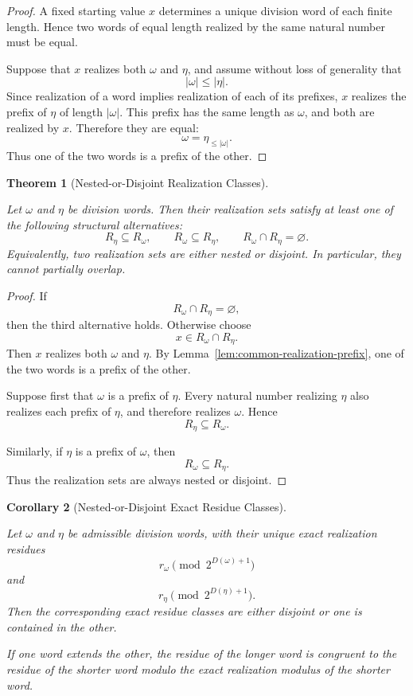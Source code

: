 \documentclass[12pt, oneside]{article}
\numberwithin{equation}{section}
\theoremstyle{definition}
\theoremstyle{plain}
\newtheorem{theorem}{Theorem}[section]
\newtheorem{corollary}[theorem]{Corollary}
\theoremstyle{remark}
\begin{document}
\begin{proof}
A fixed starting value \(x\) determines a unique division word of each
finite length. Hence two words of equal length realized by the same
natural number must be equal.

Suppose that \(x\) realizes both \(\omega\) and \(\eta\), and assume
without loss of generality that
\[
|\omega|\le|\eta|.
\]
Since realization of a word implies realization of each of its prefixes,
\(x\) realizes the prefix of \(\eta\) of length \(|\omega|\). This prefix
has the same length as \(\omega\), and both are realized by \(x\).
Therefore they are equal:
\[
\omega=\eta_{\le|\omega|}.
\]
Thus one of the two words is a prefix of the other.
\end{proof}

\begin{theorem}[Nested-or-Disjoint Realization Classes]
\label{thm:realization-classes-nested-disjoint}

Let \(\omega\) and \(\eta\) be division words. Then their realization sets
satisfy at least one of the following structural alternatives:
\[
R_\eta\subseteq R_\omega,
\qquad
R_\omega\subseteq R_\eta,
\qquad
R_\omega\cap R_\eta=\varnothing.
\]
Equivalently, two realization sets are either nested or disjoint. In
particular, they cannot partially overlap.
\end{theorem}

\begin{proof}
If
\[
R_\omega\cap R_\eta=\varnothing,
\]
then the third alternative holds.  Otherwise choose
\[
x\in R_\omega\cap R_\eta.
\]
Then \(x\) realizes both \(\omega\) and \(\eta\). By
Lemma~\ref{lem:common-realization-prefix}, one of the two words is a
prefix of the other.

Suppose first that \(\omega\) is a prefix of \(\eta\). Every natural
number realizing \(\eta\) also realizes each prefix of \(\eta\), and
therefore realizes \(\omega\). Hence
\[
R_\eta\subseteq R_\omega.
\]

Similarly, if \(\eta\) is a prefix of \(\omega\), then
\[
R_\omega\subseteq R_\eta.
\]
Thus the realization sets are always nested or disjoint.
\end{proof}

\begin{corollary}[Nested-or-Disjoint Exact Residue Classes]
\label{cor:exact-residue-classes-nested-disjoint}

Let \(\omega\) and \(\eta\) be admissible division words, with their
unique exact realization residues
\[
r_\omega \pmod{2^{D(\omega)+1}}
\]
and
\[
r_\eta \pmod{2^{D(\eta)+1}}.
\]
Then the corresponding exact residue classes are either disjoint or one
is contained in the other.

If one word extends the other, the residue of the longer word is
congruent to the residue of the shorter word modulo the exact
realization modulus of the shorter word.
\end{corollary}
\end{document}
